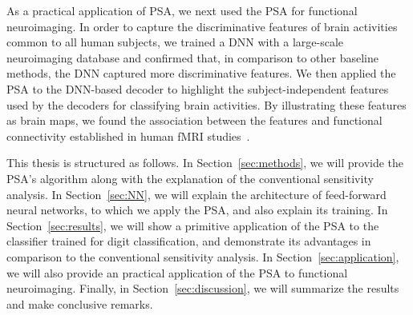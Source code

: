 As a practical application of PSA, we next used the PSA for functional neuroimaging.
%
In order to capture the discriminative features of brain activities
common to all human subjects,
we trained a DNN with a large-scale neuroimaging database and confirmed
that, in comparison to other baseline methods, the DNN captured more discriminative features.
%
We then applied the PSA to the DNN-based decoder to highlight the subject-independent
features used by the decoders for classifying brain activities.
%
By illustrating these features as brain maps, we found the association between
the features and functional connectivity established in human fMRI studies~\cite{raichle2001default,raichle2007default,taylor2009two,cole2013multi}.

This thesis is structured as follows.
%
In Section~\ref{sec:methods}, we will provide the PSA's algorithm along with
the explanation of the conventional sensitivity analysis.
%
In Section~\ref{sec:NN}, we will explain the architecture of
 feed-forward neural networks, to which we apply the PSA, and
 also explain its training.
%
In Section~\ref{sec:results}, we will show a primitive application of
the PSA to the classifier trained for digit classification,
and demonstrate its advantages in comparison to the conventional sensitivity analysis.
%
In Section~\ref{sec:application}, we will also provide an practical
application of the PSA to functional neuroimaging.
%
Finally, in Section~\ref{sec:discussion}, we will summarize the results
and make conclusive remarks.
